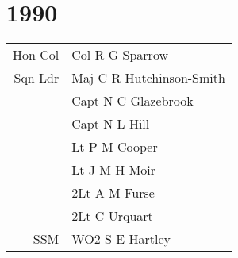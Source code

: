 \chapter*{1990}

\begin{center}
  \begin{tabular}{rl}
    Hon Col & Col R G Sparrow \\
    Sqn Ldr & Maj C R Hutchinson-Smith \\
    & Capt N C Glazebrook \\
    & Capt N L Hill \\
    & Lt P M Cooper \\
    & Lt J M H Moir \\
    & 2Lt A M Furse \\
    & 2Lt C Urquart \\
    SSM & WO2 S E Hartley \\
  \end{tabular}
\end{center}

